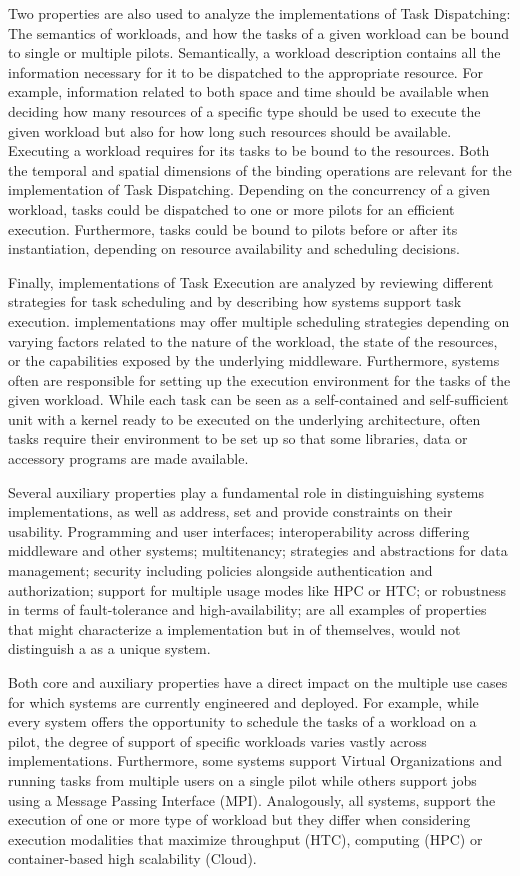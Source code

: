 \documentclass{sig-alternate}
\begin{document}
Two properties are also used to analyze the implementations of Task
Dispatching: The semantics of workloads, and how the tasks of a given workload
can be bound to single or multiple pilots. Semantically, a workload description
contains all the information necessary for it to be dispatched to the
appropriate resource. For example, information related to both space and time
should be available when deciding how many resources of a specific type should
be used to execute the given workload but also for how long such resources
should be available. Executing a workload requires for its tasks to be bound to
the resources. Both the temporal and spatial dimensions of the binding
operations are relevant for the implementation of Task Dispatching. Depending
on the concurrency of a given workload, tasks could be dispatched to one or
more pilots for an efficient execution. Furthermore, tasks could be bound to
pilots before or after its instantiation, depending on resource availability
and scheduling decisions.

Finally, implementations of Task Execution are analyzed by reviewing different
strategies for task scheduling and by describing how \pilot systems support
task execution. \pilot implementations may offer multiple scheduling
strategies depending on varying factors related to the nature of the workload,
the state of the resources, or the capabilities exposed by the underlying
middleware. Furthermore, \pilot systems often are responsible for setting up
the execution environment for the tasks of the given workload. While each task
can be seen as a self-contained and self-sufficient unit with a kernel ready to
be executed on the underlying architecture, often tasks require their
environment to be set up so that some libraries, data or accessory programs
are made available.

Several auxiliary properties play a fundamental role in distinguishing
\pilot systems implementations, as well as address, set and provide
constraints on their usability.  Programming and user interfaces;
interoperability across differing middleware and other \pilot systems;
multitenancy; strategies and abstractions for data management;
security including policies alongside authentication and
authorization; support for multiple usage modes like HPC or HTC; or
robustness in terms of fault-tolerance and high-availability; are all
examples of properties that might characterize a \pilot implementation
but in of themselves, would not distinguish a \pilot as a unique
system.

Both core and auxiliary properties have a direct impact on the multiple use
cases for which \pilot systems are currently engineered and deployed. For
example, while every \pilot system offers the opportunity to schedule the
tasks of a workload on a pilot, the degree of support of specific workloads
varies vastly across implementations. Furthermore, some \pilot systems
support Virtual Organizations and running tasks from multiple users on a single
pilot while others support jobs using a Message Passing Interface (MPI).
Analogously, all \pilot systems, support the execution of one or more type
of workload but they differ when considering execution modalities that maximize
throughput (HTC), computing (HPC) or container-based high scalability (Cloud).
\end{document}
